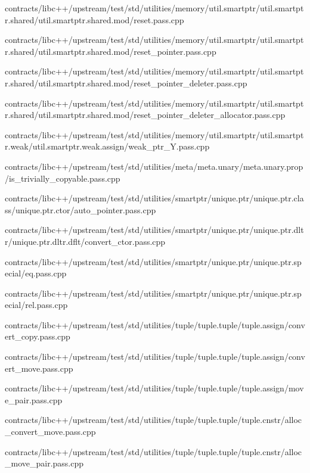\begin{DoxyCompactItemize}
contracts/libc++/upstream/test/std/utilities/memory/util.\+smartptr/util.\+smartptr.\+shared/util.\+smartptr.\+shared.\+mod/reset.\+pass.\+cpp\item 
contracts/libc++/upstream/test/std/utilities/memory/util.\+smartptr/util.\+smartptr.\+shared/util.\+smartptr.\+shared.\+mod/reset\+\_\+pointer.\+pass.\+cpp\item 
contracts/libc++/upstream/test/std/utilities/memory/util.\+smartptr/util.\+smartptr.\+shared/util.\+smartptr.\+shared.\+mod/reset\+\_\+pointer\+\_\+deleter.\+pass.\+cpp\item 
contracts/libc++/upstream/test/std/utilities/memory/util.\+smartptr/util.\+smartptr.\+shared/util.\+smartptr.\+shared.\+mod/reset\+\_\+pointer\+\_\+deleter\+\_\+allocator.\+pass.\+cpp\item 
contracts/libc++/upstream/test/std/utilities/memory/util.\+smartptr/util.\+smartptr.\+weak/util.\+smartptr.\+weak.\+assign/weak\+\_\+ptr\+\_\+\+Y.\+pass.\+cpp\item 
contracts/libc++/upstream/test/std/utilities/meta/meta.\+unary/meta.\+unary.\+prop/is\+\_\+trivially\+\_\+copyable.\+pass.\+cpp\item 
contracts/libc++/upstream/test/std/utilities/smartptr/unique.\+ptr/unique.\+ptr.\+class/unique.\+ptr.\+ctor/auto\+\_\+pointer.\+pass.\+cpp\item 
contracts/libc++/upstream/test/std/utilities/smartptr/unique.\+ptr/unique.\+ptr.\+dltr/unique.\+ptr.\+dltr.\+dflt/convert\+\_\+ctor.\+pass.\+cpp\item 
contracts/libc++/upstream/test/std/utilities/smartptr/unique.\+ptr/unique.\+ptr.\+special/eq.\+pass.\+cpp\item 
contracts/libc++/upstream/test/std/utilities/smartptr/unique.\+ptr/unique.\+ptr.\+special/rel.\+pass.\+cpp\item 
contracts/libc++/upstream/test/std/utilities/tuple/tuple.\+tuple/tuple.\+assign/convert\+\_\+copy.\+pass.\+cpp\item 
contracts/libc++/upstream/test/std/utilities/tuple/tuple.\+tuple/tuple.\+assign/convert\+\_\+move.\+pass.\+cpp\item 
contracts/libc++/upstream/test/std/utilities/tuple/tuple.\+tuple/tuple.\+assign/move\+\_\+pair.\+pass.\+cpp\item 
contracts/libc++/upstream/test/std/utilities/tuple/tuple.\+tuple/tuple.\+cnstr/alloc\+\_\+convert\+\_\+move.\+pass.\+cpp\item 
contracts/libc++/upstream/test/std/utilities/tuple/tuple.\+tuple/tuple.\+cnstr/alloc\+\_\+move\+\_\+pair.\+pass.\+cpp\item 

\end{DoxyCompactItemize}
